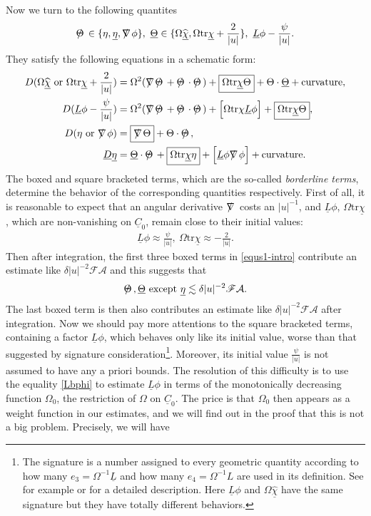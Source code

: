 \documentclass[11pt,reqno]{amsart}
\theoremstyle{definition}
\numberwithin{equation}{section}
\newcommand{\tr}{\mathrm{tr}}
\def\chib{\underline{\chi}}
\def\chibh{\widehat{\underline{\chi}}}
\def\etab{\underline{\eta}}
\def\Lb{\underline{L}}
\def\tr{\mathrm{tr}}
\def\Cb{\underline{C}}
\newcommand{\Db}{\underline{D}}
\def\nablas{\mbox{$\nabla \mkern -13mu /$ }}
\def\Thetas{\mbox{$\Theta \mkern -12mu /$ }}
\begin{document}
Now we turn to the following quantites
\begin{align*}
 \Thetas\in\{\eta,\etab,\nablas\phi\},\ \underline{\Theta}\in\{\Omega\chibh,\Omega\tr\chib+\frac{2}{|u|}\},\ \Lb\phi-\frac{\psi}{|u|}.
\end{align*}
They satisfy the following equations in a schematic form:
\begin{equation}\label{equs1-intro}
\begin{split}
D(\Omega\chibh\ \text{or}\ \Omega\tr\chib+\frac{2}{|u|})&=\Omega^2(\nablas\Thetas+\Thetas\cdot\Thetas)+\text{\fbox{$\Omega\tr\chib\Theta$}}+\Theta\cdot\underline{\Theta}+\text{curvature},\\
D(\Lb\phi-\frac{\psi}{|u|})&=\Omega^2(\nablas\Thetas+\Thetas\cdot\Thetas)+\Big[\Omega\tr\chi\Lb\phi\Big]+\text{\fbox{$\Omega\tr\chib\Theta$}},\\
D(\eta\ \text{or}\ \nablas\phi)&=\text{\fbox{$\nablas\Theta$}}+\Theta\cdot\Thetas,\\
\Db\etab&=\underline{\Theta}\cdot\Thetas+\text{\fbox{$\Omega\tr\chib\eta$}}+\Big[\Lb\phi\nablas\phi\Big]+\text{curvature}.
\end{split}
\end{equation}
The boxed and square bracketed terms, which are the so-called \emph{borderline terms}, determine the behavior of the corresponding quantities respectively. First of all, it is reasonable to expect that an angular derivative $\nablas$ costs an $|u|^{-1}$, and $\Lb\phi$, $\Omega\tr\chib$, which are non-vanishing on $\Cb_0$, remain close to their initial values:
\begin{align*}
\Lb\phi\approx\frac{\psi}{|u|},\ \Omega\tr\chib\approx-\frac{2}{|u|}.
\end{align*}
Then after integration, the first three boxed terms in \eqref{equs1-intro} contribute an estimate like $\delta|u|^{-2}\mathscr{F}\mathcal{A}$ and this suggests that
\begin{align}\label{estimate-Thetas-intro}
\Thetas,\underline{\Theta}\ \text{except}\ \etab\lesssim\delta|u|^{-2}\mathscr{F}\mathcal{A}.
\end{align}
The last boxed term is then also contributes an estimate like $\delta|u|^{-2}\mathscr{F}\mathcal{A}$ after integration. Now we should pay more attentions to the square bracketed terms, containing a factor $\Lb\phi$, which behaves only like its initial value, worse than that suggested by signature consideration\footnote{The signature is a number assigned to every geometric quantity according to how many $e_3=\Omega^{-1}\Lb$ and how many $e_4=\Omega^{-1}L$ are used in its definition. See for example \cite{Ch-K} or \cite{K-R} for a detailed description. Here $\Lb\phi$ and $\Omega\chibh$ have the same signature but they have totally different behaviors.}. Moreover, its initial value $\frac{\psi}{|u|}$ is not assumed to have any a priori bounds. The resolution of this difficulty is to use the equality \eqref{Lbphi} to estimate $\Lb\phi$ in terms of the monotonically decreasing function $\Omega_0$, the restriction of $\Omega$ on $\Cb_0$. The price is that $\Omega_0$ then appears as a weight function in our estimates, and we will find out in the proof that this is not a big problem. Precisely, we will have
\end{document}
